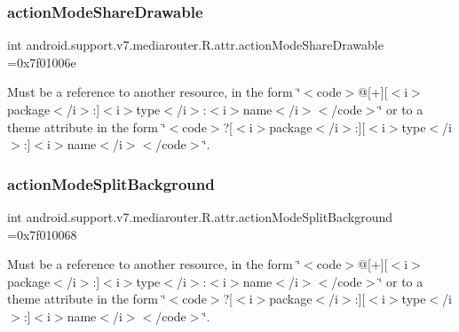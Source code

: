\subsubsection{\texorpdfstring{action\+Mode\+Share\+Drawable}{actionModeShareDrawable}}
{\footnotesize\ttfamily int android.\+support.\+v7.\+mediarouter.\+R.\+attr.\+action\+Mode\+Share\+Drawable =0x7f01006e\hspace{0.3cm}{\ttfamily [static]}}

Must be a reference to another resource, in the form \char`\"{}$<$code$>$@\mbox{[}+\mbox{]}\mbox{[}$<$i$>$package$<$/i$>$\+:\mbox{]}$<$i$>$type$<$/i$>$\+:$<$i$>$name$<$/i$>$$<$/code$>$\char`\"{} or to a theme attribute in the form \char`\"{}$<$code$>$?\mbox{[}$<$i$>$package$<$/i$>$\+:\mbox{]}\mbox{[}$<$i$>$type$<$/i$>$\+:\mbox{]}$<$i$>$name$<$/i$>$$<$/code$>$\char`\"{}. \mbox{\label{classandroid_1_1support_1_1v7_1_1mediarouter_1_1R_1_1attr_adaf4fdcaeacbae5e63cbca33cc21ceb8}} 
\subsubsection{\texorpdfstring{action\+Mode\+Split\+Background}{actionModeSplitBackground}}
{\footnotesize\ttfamily int android.\+support.\+v7.\+mediarouter.\+R.\+attr.\+action\+Mode\+Split\+Background =0x7f010068\hspace{0.3cm}{\ttfamily [static]}}

Must be a reference to another resource, in the form \char`\"{}$<$code$>$@\mbox{[}+\mbox{]}\mbox{[}$<$i$>$package$<$/i$>$\+:\mbox{]}$<$i$>$type$<$/i$>$\+:$<$i$>$name$<$/i$>$$<$/code$>$\char`\"{} or to a theme attribute in the form \char`\"{}$<$code$>$?\mbox{[}$<$i$>$package$<$/i$>$\+:\mbox{]}\mbox{[}$<$i$>$type$<$/i$>$\+:\mbox{]}$<$i$>$name$<$/i$>$$<$/code$>$\char`\"{}. \mbox{\label{classandroid_1_1support_1_1v7_1_1mediarouter_1_1R_1_1attr_af4ab799e706109d4d08297096aa33349}} 
